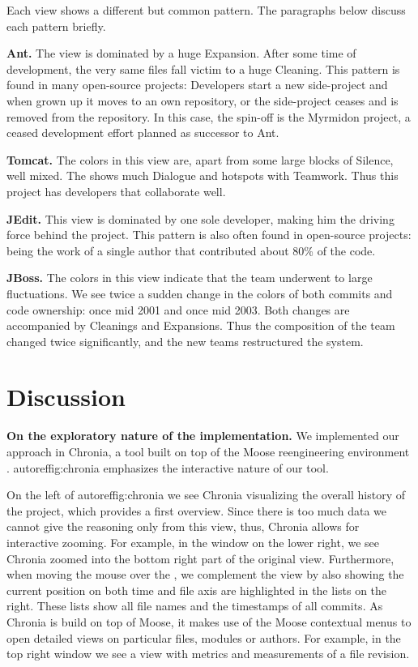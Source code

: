 \documentclass[10pt]{book}
\begin{document}
Each view shows a different but common pattern. The paragraphs below discuss each pattern briefly.

\textbf{Ant.} The view is dominated by a huge Expansion. After some time of development, the very same files fall victim to a huge Cleaning. This pattern is found in many open-source projects: Developers start a new side-project and when grown up it moves to an own repository, or the side-project ceases and is removed from the repository. In this case, the spin-off is the Myrmidon project, a ceased development effort planned as successor to Ant.

\textbf{Tomcat.} The colors in this view are, apart from some large blocks of Silence, well mixed. The \omap shows much Dialogue and hotspots with Teamwork. Thus this project has developers that  collaborate well.

\textbf{JEdit.} This view is dominated by one sole developer, making him the driving force behind the project. This pattern is also often found in open-source projects: being the work of a single author that contributed about 80\% of the code.

\textbf{JBoss.} The colors in this view indicate that the team underwent to large fluctuations. We see twice a sudden change in the colors of both commits and code ownership: once mid 2001 and once mid 2003. Both changes are accompanied by Cleanings and Expansions. Thus the composition of the team changed twice significantly, and the new teams restructured the system.

\section{Discussion}\label{sec:discussion}

\textbf{On the exploratory nature of the implementation.} We implemented our approach in Chronia, a tool built on top of the Moose reengineering environment \cite{Duca05a}. autoref{fig:chronia} emphasizes the interactive nature of our tool.

On the left of autoref{fig:chronia} we see Chronia visualizing the overall history of the project, which provides a first overview. Since there is too much data we cannot give the reasoning only from this view, thus, Chronia allows for interactive zooming. For example, in the window on the lower right, we see Chronia zoomed into the bottom right part of the original view. Furthermore, when moving the mouse over the \omap, we complement the view by also showing the current position on both time and file axis are highlighted in the lists on the right. These lists show all file names and the timestamps of all commits. As Chronia is build on top of Moose, it makes use of the Moose contextual menus to open detailed views on particular files, modules or authors. For example, in the top right window we see a view with metrics and measurements of a file revision.
\end{document}
